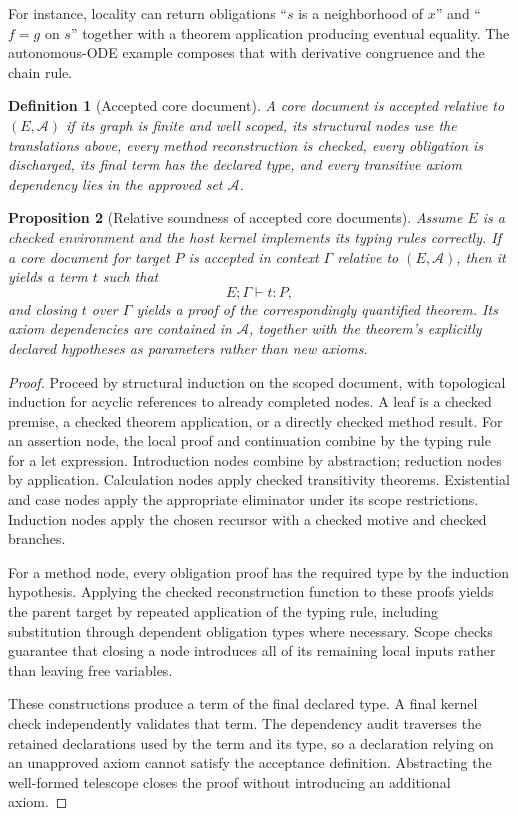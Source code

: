 \documentclass[11pt,a4paper]{article}
\newtheorem{proposition}{Proposition}[section]
\newtheorem{definition}[proposition]{Definition}
\theoremstyle{remark}
\begin{document}
For instance, locality can return obligations ``$s$ is a neighborhood of $x$'' and ``$f=g$ on $s$'' together with a theorem application producing eventual equality. The autonomous-ODE example composes that with derivative congruence and the chain rule.

\begin{definition}[Accepted core document]
A core document is accepted relative to $(E,\mathcal{A})$ if its graph is finite and well scoped, its structural nodes use the translations above, every method reconstruction is checked, every obligation is discharged, its final term has the declared type, and every transitive axiom dependency lies in the approved set $\mathcal{A}$.
\end{definition}

\begin{proposition}[Relative soundness of accepted core documents]\label{prop:soundness}
Assume $E$ is a checked environment and the host kernel implements its typing rules correctly. If a core document for target $P$ is accepted in context $\Gamma$ relative to $(E,\mathcal{A})$, then it yields a term $t$ such that
\[
E;\Gamma\vdash t:P,
\]
and closing $t$ over $\Gamma$ yields a proof of the correspondingly quantified theorem. Its axiom dependencies are contained in $\mathcal{A}$, together with the theorem's explicitly declared hypotheses as parameters rather than new axioms.
\end{proposition}
\begin{proof}
Proceed by structural induction on the scoped document, with topological induction for acyclic references to already completed nodes. A leaf is a checked premise, a checked theorem application, or a directly checked method result. For an assertion node, the local proof and continuation combine by the typing rule for a let expression. Introduction nodes combine by abstraction; reduction nodes by application. Calculation nodes apply checked transitivity theorems. Existential and case nodes apply the appropriate eliminator under its scope restrictions. Induction nodes apply the chosen recursor with a checked motive and checked branches.

For a method node, every obligation proof has the required type by the induction hypothesis. Applying the checked reconstruction function to these proofs yields the parent target by repeated application of the typing rule, including substitution through dependent obligation types where necessary. Scope checks guarantee that closing a node introduces all of its remaining local inputs rather than leaving free variables.

These constructions produce a term of the final declared type. A final kernel check independently validates that term. The dependency audit traverses the retained declarations used by the term and its type, so a declaration relying on an unapproved axiom cannot satisfy the acceptance definition. Abstracting the well-formed telescope closes the proof without introducing an additional axiom.
\end{proof}
\end{document}
